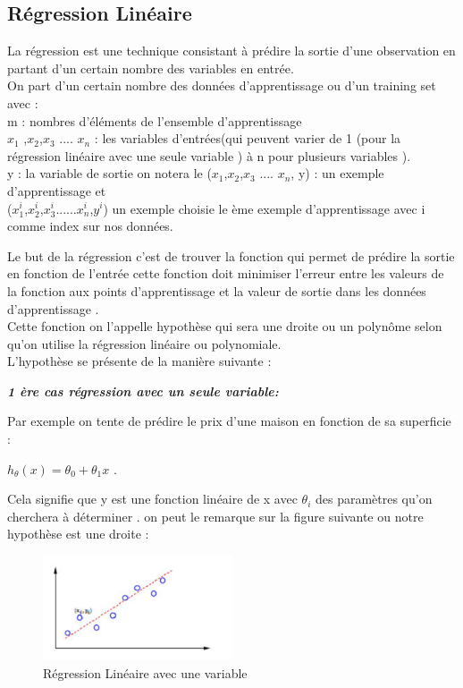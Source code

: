  \subsection{Régression Linéaire }
La régression est une technique consistant à prédire la sortie  d'une    observation en partant d'un certain nombre des variables  en entrée.\\
On part d'un certain nombre des données  d'apprentissage ou  d'un training set 
avec : \\
m :  nombres d'éléments de l'ensemble d'apprentissage \\
${x}_{1}$ ,${x}_{2}$,${x}_{3}$ .... ${x}_{n}$ : les variables d'entrées(qui peuvent varier de 1 (pour la régression linéaire avec une seule variable ) à n pour plusieurs variables  ).\\
y : la variable  de sortie 
on notera le (${x}_{1}$,${x}_{2}$,${x}_{3}$ .... ${x}_{n}$, y) : un exemple d'apprentissage
et\\
(${x}_{1}^{i}$,${x}_{2}^{i}$,${x}_{3}^{i}$......${x}_{n}^{i}$,${y}^{i}$)  un exemple choisie le ème exemple d'apprentissage avec  i comme index sur nos données.

Le but  de la régression c'est de trouver la fonction qui permet de prédire la sortie en fonction de l'entrée cette fonction doit  minimiser l'erreur entre les valeurs de la fonction aux points d'apprentissage et la valeur de sortie dans les données d'apprentissage .\\
Cette fonction on l'appelle hypothèse qui sera une droite ou un polynôme selon qu'on utilise la régression linéaire ou polynomiale. \\
L'hypothèse se présente de la manière suivante :

\textbf{\emph{1 ère cas régression avec un seule variable: }} 

Par exemple on tente de prédire le prix d'une maison en fonction de sa superficie : 

${h}_{\theta}\left(x\right)={\theta }_{0}+{\theta }_{1}x$ .

Cela signifie que  y est une fonction linéaire de x avec ${\theta }_{i}$ des paramètres qu'on cherchera à déterminer .
on peut le remarque sur la figure suivante ou notre hypothèse est une droite :
\begin{figure}[ht]
	\centering
	\includegraphics[width=0.5\textwidth]{fig/regressionLineaire1var.png}
	\caption[Short caption]{Régression Linéaire avec une variable}
	\label{fig:image1}
\end{figure}


